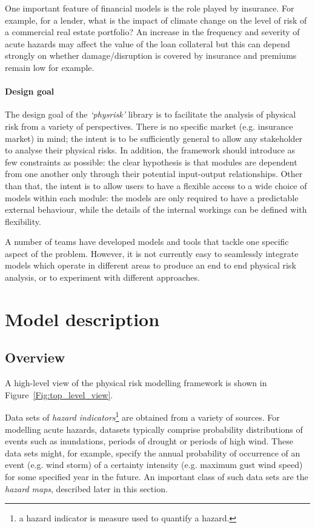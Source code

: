 \documentclass[a4paper,11pt]{extarticle} %
\theoremstyle{definition}
\begin{document}
One important feature of financial models is the role played by insurance. For example, for a lender, what is the impact of climate change on the level of risk of a commercial real estate portfolio? An increase in the frequency and severity of acute hazards may affect the value of the loan collateral but this can depend strongly on whether damage/disruption is covered by insurance and premiums remain low for example.


\paragraph{Design goal}
The design goal of the \emph{`physrisk'} library is to facilitate the analysis of physical risk from a variety of perspectives. There is no specific market (e.g. insurance market) in mind; the intent is to be sufficiently general to allow any stakeholder to analyse their physical risks. In addition, the framework should introduce as few constraints as possible: the clear hypothesis is that modules are dependent from one another only through their potential input-output relationships. Other than that, the intent is to allow users to have a flexible access to a wide choice of models within each module: the models are only required to have a predictable external behaviour, while the details of the internal workings can be defined with flexibility.

A number of teams have developed models and tools that tackle one specific aspect of the problem. However, it is not currently easy to seamlessly integrate models which operate in different areas to produce an end to end physical risk analysis, or to experiment with different approaches.

\section{Model description}

\subsection{Overview}
A high-level view of the physical risk modelling framework is shown in Figure~\ref{Fig:top_level_view}.

Data sets of \emph{hazard indicators}\footnote{a hazard indicator is measure used to quantify a hazard.} are obtained from a variety of sources. For modelling acute hazards, datasets typically comprise probability distributions of events such as inundations, periods of drought or periods of high wind. These data sets might, for example, specify the annual probability of occurrence of an event (e.g. wind storm) of a certainty intensity (e.g. maximum gust wind speed) for some specified year in the future. An important class of such data sets are the \emph{hazard maps}, described later in this section.
\end{document}
